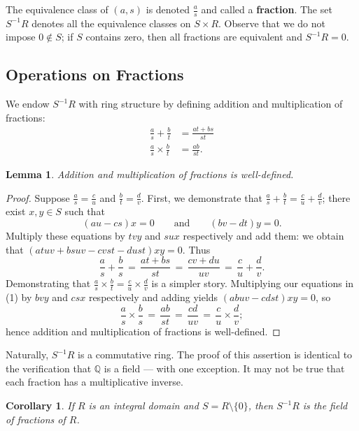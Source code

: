 \documentclass[11pt]{article}
\newtheorem{lemma}{Lemma}
\newtheorem{corollary}{Corollary}
\begin{document}
The equivalence class of $(a, s)$ is denoted $\tfrac{a}{s}$ and called a \textbf{fraction}. The set $S^{-1}R$ denotes all the equivalence classes on $S \times R$. Observe that we do not impose $0 \notin S$; if $S$ contains zero, then all fractions are equivalent and $S^{-1}R = 0$.

\subsection{Operations on Fractions}

We endow $S^{-1}R$ with ring structure by defining addition and multiplication of fractions:
\begin{align*}
  \frac{a}{s} + \frac{b}{t} &= \frac{at + bs}{st} \\
  \frac{a}{s} \times \frac{b}{t} &= \frac{ab}{st}.
\end{align*}
\begin{adjustwidth}{1cm}{}
  \begin{lemma}
    Addition and multiplication of fractions is well-defined.
  \end{lemma}
  \begin{proof}
    Suppose $\tfrac{a}{s} = \tfrac{c}{u}$ and $\tfrac{b}{t} = \tfrac{d}{v}$. First, we demonstrate that $\tfrac{a}{s} + \tfrac{b}{t} = \tfrac{c}{u} + \tfrac{d}{v}$; there exist $x, y \in S$ such that
    \begin{equation}
      (au - cs)x = 0 \qquad \text{and} \qquad (bv - dt)y = 0.
    \end{equation}
    Multiply these equations by $tvy$ and $sux$ respectively and add them: we obtain that $(atuv + bsuv - cvst - dust)xy = 0$. Thus
    \[
      \frac{a}{s} + \frac{b}{s} \, = \, \frac{at + bs}{st} \, = \, \frac{cv + du}{uv} \, = \, \frac{c}{u} + \frac{d}{v}.
    \]
    Demonstrating that $\tfrac{a}{s} \times \tfrac{b}{t} = \tfrac{c}{u} \times \tfrac{d}{v}$ is a simpler story. Multiplying our equations in (1) by $bvy$ and $csx$ respectively and adding yields $(abuv - cdst)xy = 0$, so
    \[
      \frac{a}{s} \times \frac{b}{s} \, = \, \frac{ab}{st} \, = \, \frac{cd}{uv} \, = \, \frac{c}{u} \times \frac{d}{v};
    \]
    hence addition and multiplication of fractions is well-defined. 
  \end{proof}
\end{adjustwidth}

Naturally, $S^{-1}R$ is a commutative ring. The proof of this assertion is identical to the verification that $\mathbb{Q}$ is a field --- with one exception. It may not be true that each fraction has a multiplicative inverse.

\begin{adjustwidth}{1cm}{}
  \begin{corollary}
    If $R$ is an integral domain and $S = R \setminus \{ 0 \}$, then $S^{-1}R$ is the field of fractions of $R$.
  \end{corollary}
\end{adjustwidth}




\end{document}
